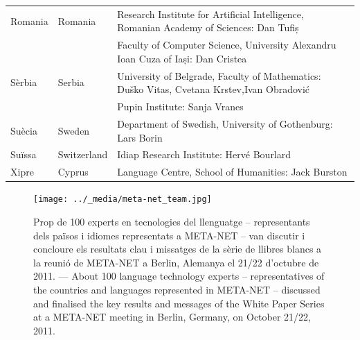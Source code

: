\begin{longtable}{@{}llp{114mm}@{}}
  Romania & \textcolor{grey1}{Romania} & Research Institute for Artificial Intelligence, Romanian Academy of Sciences: Dan Tufiș \\ \addlinespace
  & & Faculty of Computer Science, University Alexandru Ioan Cuza of Iași: Dan Cristea \\ \addlinespace
  Sèrbia & \textcolor{grey1}{Serbia} & University of Belgrade, Faculty of Mathematics: Duško Vitas, Cvetana Krstev,\newline Ivan Obradović \\ \addlinespace
  & & Pupin Institute: Sanja Vranes \\ \addlinespace  
  Suècia & \textcolor{grey1}{Sweden} & Department of Swedish, University of Gothenburg: Lars Borin \\ \addlinespace 
  Suïssa & \textcolor{grey1}{Switzerland} & Idiap Research Institute: Hervé Bourlard \\ \addlinespace 
  Xipre & \textcolor{grey1}{Cyprus} & Language Centre, School of Humanities: Jack Burston
\end{longtable}
\normalsize

\renewcommand*{\figureformat}{}
\renewcommand*{\captionformat}{}

\begin{figure}[htbp]
  \center
  \texttt{[image: ../\_media/meta-net\_team.jpg]}
  \caption{Prop de 100 experts en tecnologies del llenguatge -- representants dels països i idiomes representats a META-NET --  van discutir i concloure els resultats clau i missatges de la sèrie de llibres blancs a la reunió de META-NET a Berlin, Alemanya el 21/22 d'octubre de 2011. ---
 \textcolor{grey1}{About 100 language technology experts -- representatives of the countries and languages represented in META-NET -- discussed and finalised the key results and messages of the White Paper Series at a META-NET meeting in Berlin, Germany, on October 21/22, 2011.}}
  \medskip
\end{figure}

\cleardoublepage

\label{whitepaperseries}

